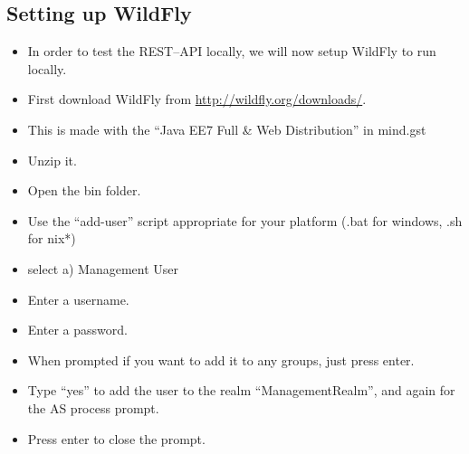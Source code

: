 \subsection*{Setting up WildFly}
\begin{itemize}
    \item In order to test the REST--API locally, we will now setup WildFly to run locally.
    \item First download WildFly from \url{http://wildfly.org/downloads/}.
    \item This is made with the ``Java EE7 Full \& Web Distribution'' in mind.gst
    \item Unzip it.
    \item Open the bin folder.
    \item Use the ``add-user'' script appropriate for your platform (.bat for windows, .sh for nix*)
    \item select a) Management User
    \item Enter a username.
    \item Enter a password.
    \item When prompted if you want to add it to any groups, just press enter.
    \item Type ``yes'' to add the user to the realm ``ManagementRealm'', and again for the AS process prompt.
    \item Press enter to close the prompt.
\end{itemize}

